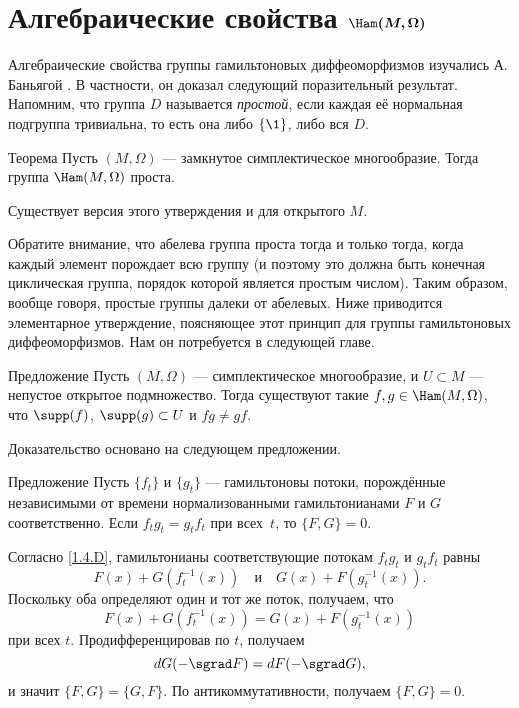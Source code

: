 {\section[\texorpdfstring{Алгебраические свойства $\Ham(M,\Omega)$}{Алгебраические свойства Ham(M,Ω)}]%
{Алгебраические свойства $\bm{\Ham(M, \Omega)}$}

Алгебраические свойства группы гамильтоновых диффеоморфизмов изучались А. Баньягой \cite{B1,B2}.
В частности, он доказал следующий поразительный результат.
Напомним, что группа $D$ называется \emph{простой}, если каждая её нормальная подгруппа тривиальна, то есть она либо $\{\1\}$, либо вся $D$.

\begin{thm}{Теорема}\label{1.5.A}
Пусть $(M, \Omega)$ — замкнутое симплектическое многообразие.
Тогда группа $\Ham (M, \Omega)$ проста.
\end{thm}

Существует версия этого утверждения и для открытого $M$.

Обратите внимание, что абелева группа проста тогда и только тогда, когда каждый элемент порождает всю группу (и поэтому это должна быть конечная циклическая группа, порядок которой является простым числом).
Таким образом, вообще говоря, простые группы далеки от абелевых.
Ниже приводится элементарное утверждение, поясняющее этот принцип для группы гамильтоновых диффеоморфизмов.
Нам он потребуется в следующей главе.

\begin{thm}{Предложение}\label{1.5.B}
Пусть $(M, \Omega)$ — симплектическое многообразие, и $U \subset M$ — непустое открытое подмножество.
Тогда существуют такие $f, g \in \Ham (M, \Omega)$, что $\supp (f)$, $\supp (g) \subset U$ и $f g \ne gf$.
\end{thm}

Доказательство основано на следующем предложении.

\begin{thm}{Предложение}\label{1.5.C}
Пусть $\{f_t\}$ и $\{g_t\}$ — гамильтоновы потоки, порождённые независимыми от времени нормализованными гамильтонианами $F$ и $G$ соответственно.
Если $f_t g_t = g_t f_t$ при всех~$t$, то $\{F, G\} = 0$.
\end{thm}

Согласно \ref{1.4.D}, гамильтонианы соответствующие потокам $f_t g_t$ и $g_t f_t$ равны
\[F(x)+G(f_t^{-1} (x))
\quad\text{и}\quad
G (x) + F (g_t^{-1}(x)).
\]
Поскольку оба определяют один и тот же поток, получаем, что 
\[F (x) + G (f_t^{-1} (x)) = G (x) + F (g_t^{-1} (x))\]
при всех $t$.
Продифференцировав по $t$, получаем
\[\d G(-\sgrad F)=\d F(-\sgrad G),\]
и значит $\{F, G\} = \{G, F\}$.
По антикоммутативности, получаем $\{F, G\} = 0$.
\qeds

}
